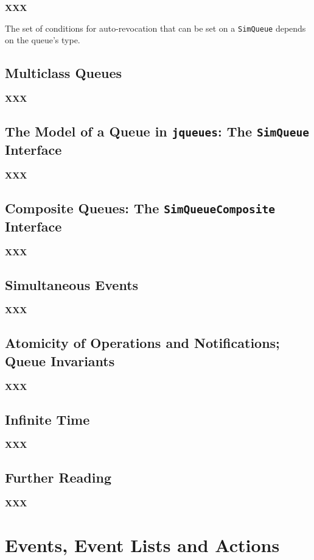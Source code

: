 \documentclass[12pt]{book}
\begin{document}
{\bf XXX}

The set of conditions for auto-revocation
  that can be set on a \lstinline|SimQueue|
  depends on the queue's type.

\section{Multiclass Queues}
\label{sec:guided:qos}

{\bf XXX}

\section{The Model of a Queue in \lstinline|jqueues|: The \lstinline|SimQueue| Interface}
\label{sec:guided:simqueue-model}

{\bf XXX}

\section{Composite Queues: The \lstinline|SimQueueComposite| Interface}
\label{sec:guided:simqueue-composite}

{\bf XXX}

\section{Simultaneous Events}
\label{sec:guided:simultaneous-events}

{\bf XXX}

\section{Atomicity of Operations and Notifications; Queue Invariants}
\label{sec:guided:atomicity}

{\bf XXX}

\section{Infinite Time}
\label{sec:infinite-time}

{\bf XXX}

\section{Further Reading}
\label{sec:guided:further-reading}

{\bf XXX}

\chapter{Events, Event Lists and Actions}
\label{sec:events-eventlists-actions}
\end{document}
